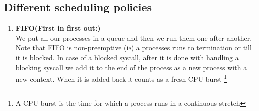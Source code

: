 \documentclass[12pt]{article}
\begin{document}
\subsection{Different scheduling policies}
\begin{enumerate}
    

    \item \textbf{FIFO(First in first out:)}\\
    We put all our processes in a queue and then we run them one after another.
    Note that FIFO is non-preemptive (ie) a processes runs to termination or till it is blocked. In case of a blocked syscall, after it is done with handling
    a blocking syscall we add it to the end of the process as a new process with a new context. When it is added back it counts as a fresh CPU burst
    \footnote{A CPU burst is the time for which a process runs in a continuous stretch}


\end{enumerate}
\end{document}
